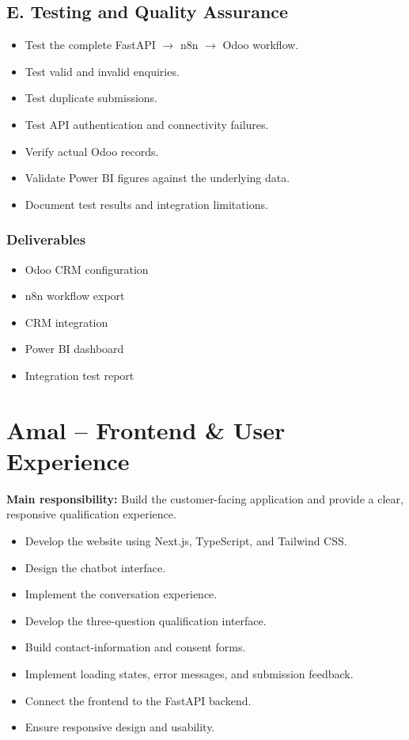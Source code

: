 \documentclass[11pt,a4paper]{article}
\begin{document}
\subsection*{E. Testing and Quality Assurance}
\begin{itemize}
  \item Test the complete FastAPI $\rightarrow$ n8n $\rightarrow$ Odoo workflow.
  \item Test valid and invalid enquiries.
  \item Test duplicate submissions.
  \item Test API authentication and connectivity failures.
  \item Verify actual Odoo records.
  \item Validate Power BI figures against the underlying data.
  \item Document test results and integration limitations.
\end{itemize}

\subsubsection*{Deliverables}
\begin{itemize}
  \item Odoo CRM configuration
  \item n8n workflow export
  \item CRM integration
  \item Power BI dashboard
  \item Integration test report
\end{itemize}

\newpage
\section{Amal -- Frontend \& User Experience}

\textbf{Main responsibility:} Build the customer-facing application and provide a clear, responsive qualification experience.

\begin{itemize}
  \item Develop the website using Next.js, TypeScript, and Tailwind CSS.
  \item Design the chatbot interface.
  \item Implement the conversation experience.
  \item Develop the three-question qualification interface.
  \item Build contact-information and consent forms.
  \item Implement loading states, error messages, and submission feedback.
  \item Connect the frontend to the FastAPI backend.
  \item Ensure responsive design and usability.
\end{itemize}
\end{document}
